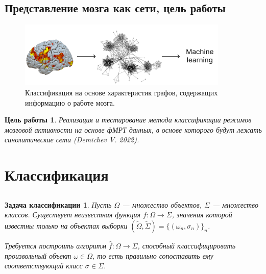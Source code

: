 \documentclass{beamer}
\newtheorem*{classification*}{Задача классификации}
\newtheorem*{purpose*}{Цель работы}
\begin{document}
		\subsection{Представление мозга как сети, цель работы}
			\begin{frame}									
				\begin{figure}
					\includegraphics[width=10cm]{../images/fmri_graph_ml_1.pdf}
					\caption{Классификация на основе характеристик графов, содержащих информацию о работе мозга.} 
					\label{fg:3}
				\end{figure}
			
				\begin{purpose*}
					Реализация и тестирование метода классификации режимов мозговой активности на основе фМРТ данных, в основе которого будут лежать синолитические сети (Demichev V.  2022).
				\end{purpose*}						
			\end{frame}
		
	\section{Классификация}
		\subsection{}
			\begin{frame}		
				\begin{classification*}
					Пусть $\Omega$ --- множество объектов, $\Sigma$ --- множество классов. Существует неизвестная функция $f: \Omega \rightarrow \Sigma$, значения которой известны только на объектах выборки $(\widetilde{\Omega}, \widetilde{\Sigma}) =  \{(\omega_{n}, \sigma_{n})\}_n$. 
					\vspace{0.35cm}
					
					Требуется построить алгоритм $\widehat{f}: \Omega \rightarrow \Sigma$, способный классифицировать произвольный объект $\omega \in \Omega$, то есть правильно сопоставить ему соответствующий класс $\sigma \in \Sigma$.
				\end{classification*}				
			\end{frame}
		
\end{document}
